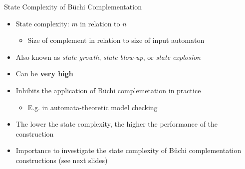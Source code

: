 \documentclass[12pt]{beamer}
\newcommand{\fat}[1]{\textbf{#1}}
\newcommand{\ita}[1]{\textit{#1}}
\begin{document}
\begin{frame}{State Complexity of Büchi Complementation}
\centering
{}
\begin{itemize}
\item State complexity: $m$ in relation to $n$
  \begin{itemize}
  \item Size of complement in relation to size of input automaton
  \end{itemize}
\pause
\item Also known as \ita{state growth}, \ita{state blow-up}, or \ita{state explosion}
\pause
\item Can be \fat{very high}
\item Inhibits the application of Büchi complemetation in practice
  \begin{itemize}
  \item E.g. in automata-theoretic model checking
  \end{itemize}
\pause
\item The lower the state complexity, the higher the performance of the construction
\item Importance to investigate the state complexity of Büchi complementation constructions (see next slides)
\end{itemize}
\end{frame}
\end{document}

